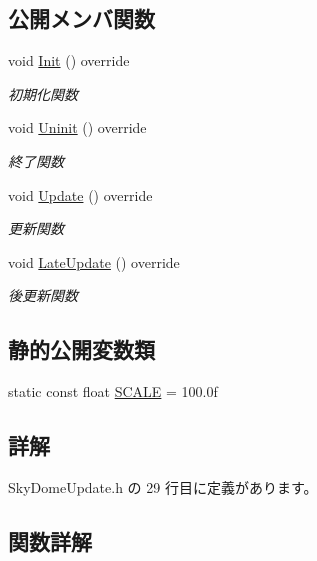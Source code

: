 \subsection*{公開メンバ関数}
\begin{DoxyCompactItemize}
\item 
void \mbox{\hyperlink{class_sky_dome_update_ab4fec6d13590c07e39e6e8b4f7f7613a}{Init}} () override
\begin{DoxyCompactList}\small\item\em 初期化関数 \end{DoxyCompactList}\item 
void \mbox{\hyperlink{class_sky_dome_update_a54da74ef017a22075ce473abe1345489}{Uninit}} () override
\begin{DoxyCompactList}\small\item\em 終了関数 \end{DoxyCompactList}\item 
void \mbox{\hyperlink{class_sky_dome_update_ae163cb90e4de561fe1f7b2cb311be331}{Update}} () override
\begin{DoxyCompactList}\small\item\em 更新関数 \end{DoxyCompactList}\item 
void \mbox{\hyperlink{class_sky_dome_update_a94347cb50b4dc13528738a7b812da261}{Late\+Update}} () override
\begin{DoxyCompactList}\small\item\em 後更新関数 \end{DoxyCompactList}\end{DoxyCompactItemize}
\subsection*{静的公開変数類}
\begin{DoxyCompactItemize}
\item 
static const float \mbox{\hyperlink{class_sky_dome_update_a4c6750a54880db753cfe2a4ecfd24130}{S\+C\+A\+LE}} = 100.\+0f
\end{DoxyCompactItemize}


\subsection{詳解}


 Sky\+Dome\+Update.\+h の 29 行目に定義があります。



\subsection{関数詳解}
\mbox{\label{class_sky_dome_update_ab4fec6d13590c07e39e6e8b4f7f7613a}} 
